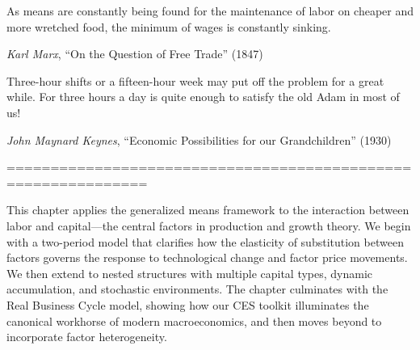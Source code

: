 % 

\epigraph{As means are constantly being found for the maintenance of labor on cheaper and more wretched food, the minimum of wages is constantly sinking.}{\textit{Karl Marx}, ``On the Question of Free Trade'' (1847)}

\epigraph{Three-hour shifts or a fifteen-hour week may put off the problem for a great while. For three hours a day is quite enough to satisfy the old Adam in most of us!}{\textit{John Maynard Keynes}, ``Economic Possibilities for our Grandchildren'' (1930)}

==============================================================
\label{chap:labor-capital}

This chapter applies the generalized means framework to the interaction between labor and capital---the central factors in production and growth theory. We begin with a two-period model that clarifies how the elasticity of substitution between factors governs the response to technological change and factor price movements. We then extend to nested structures with multiple capital types, dynamic accumulation, and stochastic environments. The chapter culminates with the Real Business Cycle model, showing how our CES toolkit illuminates the canonical workhorse of modern macroeconomics, and then moves beyond to incorporate factor heterogeneity.












